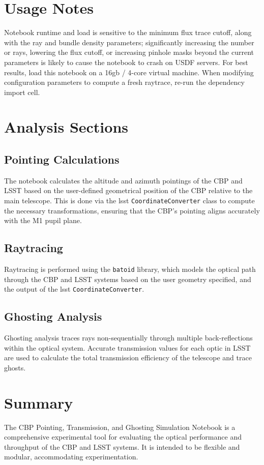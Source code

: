 \documentclass[SE,authoryear,toc]{lsstdoc}
\begin{document}
\section{Usage Notes}
Notebook runtime and load is sensitive to the minimum flux trace cutoff, along with the ray and bundle density parameters; significantly increasing the number or rays, lowering the flux cutoff, or increasing pinhole masks beyond the current parameters is likely to cause the notebook to crash on USDF servers. For best results, load this notebook on a 16gb / 4-core virtual machine. When modifying configuration parameters to compute a fresh raytrace, re-run the dependency import cell.


\section{Analysis Sections}

\subsection{Pointing Calculations}
The notebook calculates the altitude and azimuth pointings of the CBP and LSST based on the user-defined geometrical position of the CBP relative to the main telescope. This is done via the lsst \texttt{CoordinateConverter} class to compute the necessary transformations, ensuring that the CBP's pointing aligns accurately with the M1 pupil plane.

\subsection{Raytracing}
Raytracing is performed using the \texttt{batoid} library, which models the optical path through the CBP and LSST systems based on the user geometry specified, and the output of the lsst \texttt{CoordinateConverter}. 

\subsection{Ghosting Analysis}
Ghosting analysis traces rays non-sequentially through multiple back-reflections within the optical system. Accurate transmission values for each optic in LSST are used to calculate the total transmission efficiency of the telescope and trace ghosts.

\section{Summary}
The CBP Pointing, Transmission, and Ghosting Simulation Notebook is a comprehensive experimental tool for evaluating the optical performance and throughput of the CBP and LSST systems. It is intended to be flexible and modular, accommodating experimentation.
\end{document}
